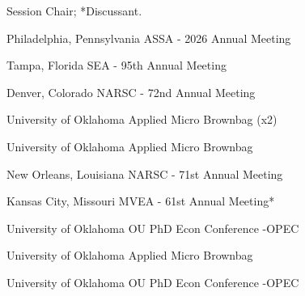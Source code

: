\textdagger Session Chair; *Discussant.


{%
	Philadelphia, Pennsylvania}
{%
	ASSA - 2026 Annual Meeting\ec}
{}


{%
	Tampa, Florida}
{%
	SEA - 95th Annual Meeting}


{%
	Denver, Colorado}
{%
	NARSC - 72nd Annual Meeting}
{}
{}

{%
	University of Oklahoma}
{%
	Applied Micro Brownbag (x2)}
{}

{%
	University of Oklahoma}
{%
	Applied Micro Brownbag}
{}

{%
	New Orleans, Louisiana}
{%
	NARSC - 71st Annual Meeting\ec}
{}

{%
	Kansas City, Missouri}
{%
	MVEA - 61st Annual Meeting*}
{}


{%
	University of Oklahoma}
{%
	OU PhD Econ Conference -OPEC}
{}

{%
	University of Oklahoma}
{%
	Applied Micro Brownbag}
{}

{%
	University of Oklahoma}
{%
	OU PhD Econ Conference -OPEC}
{}